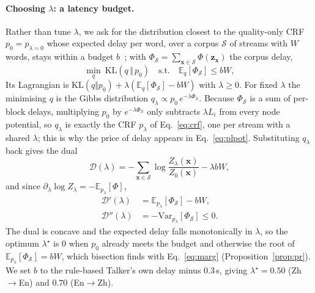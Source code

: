 \paragraph{Choosing $\lambda$: a latency budget.} Rather than tune $\lambda$, we ask for the distribution closest to the
quality-only CRF $p_0=p_{\lambda=0}$ whose expected delay per word, over a corpus $\mathcal{S}$ of streams with $W$
words, stays within a budget $b$~\citep{ganchev2010posterior}; with
$\Phi_\mathcal{S}=\sum_{\bm{x}\in\mathcal{S}}\Phi(\bm{z}_{\bm{x}})$ the corpus delay,
\begin{equation}
\min_q\ \mathrm{KL}(q\,\Vert\,p_0)\quad\text{s.t.}\quad\mathbb{E}_q[\Phi_\mathcal{S}]\le bW,
\label{eq:pr}
\end{equation}
Its Lagrangian is $\mathrm{KL}(q\Vert p_0)+\lambda(\mathbb{E}_q[\Phi_\mathcal{S}]-bW)$ with $\lambda\ge0$. For fixed
$\lambda$ the minimising $q$ is the Gibbs distribution $q_\lambda\propto p_0\,e^{-\lambda\Phi_\mathcal{S}}$. Because
$\Phi_\mathcal{S}$ is a sum of per-block delays, multiplying $p_0$ by $e^{-\lambda\Phi_\mathcal{S}}$ only subtracts
$\lambda L_i$ from every node potential, so $q_\lambda$ is exactly the CRF $p_\lambda$ of Eq.~\eqref{eq:crf}, one per
stream with a shared $\lambda$; this is why the price of delay appears in Eq.~\eqref{eq:plpot}. Substituting $q_\lambda$
back gives the dual
\begin{equation}
\mathcal{D}(\lambda)=-\sum_{\bm{x}\in\mathcal{S}}\log\frac{Z_\lambda(\bm{x})}{Z_0(\bm{x})}-\lambda bW,
\label{eq:dual}
\end{equation}
and since $\partial_\lambda\log Z_\lambda=-\mathbb{E}_{p_\lambda}[\Phi]$,
\begin{equation}
\begin{aligned}
\mathcal{D}'(\lambda)&=\mathbb{E}_{p_\lambda}[\Phi_\mathcal{S}]-bW,\\
\mathcal{D}''(\lambda)&=-\mathrm{Var}_{p_\lambda}[\Phi_\mathcal{S}]\le0.
\end{aligned}
\label{eq:dualderiv}
\end{equation}
The dual is concave and the expected delay falls monotonically in $\lambda$, so the optimum $\lambda^\star$ is $0$ when
$p_0$ already meets the budget and otherwise the root of $\mathbb{E}_{p_\lambda}[\Phi_\mathcal{S}]=bW$, which bisection
finds with Eq.~\eqref{eq:marg} (Proposition~\ref{prop:pr}). We set $b$ to the rule-based Talker's own delay minus
0.3\,s, giving $\lambda^\star=0.50$ (Zh$\rightarrow$En) and $0.70$ (En$\rightarrow$Zh).

